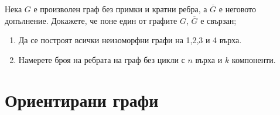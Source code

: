 \begin{problem}
  Нека $G$ е произволен граф без примки и кратни ребра, а $\overline{G}$ е неговото допълнение.
  Докажете, че поне един от графите $G$, $\overline{G}$ е свързан;
\end{problem}


\begin{problem}
  \begin{enumerate}
  \item
    Да се построят всички неизоморфни графи на 1,2,3 и 4 върха.
  \item
    Намерете броя на ребрата на граф без цикли с $n$ върха и $k$ компоненти.
  \end{enumerate}
\end{problem}

\section{Ориентирани графи}

